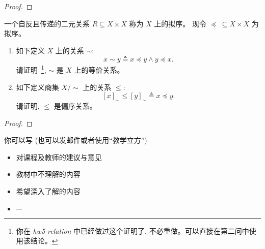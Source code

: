 \documentclass[a4paper, justified]{tufte-handout}
\begin{document}
\begin{proof}
\end{proof}

\begin{problem}[\score{4 = 0 + 4} $\star\star\star$]
  一个自反且传递的二元关系 $R \subseteq X \times X$
  称为 $X$ 上的拟序。
  现令 $\preceq\; \subseteq X \times X$ 为拟序。

  \begin{enumerate}[(1)]
    \item 如下定义 $X$ 上的关系 $\sim$:
      \[
        x \sim y \triangleq x \preceq y \land y \preceq x.
      \]
      请证明~\footnote{你在 \textsl{hw5-relation} 中已经做过这个证明了,
      不必重做。可以直接在第二问中使用该结论。}, $\sim$ 是 $X$ 上的等价关系。
    \item 如下定义商集 $X/\sim$ 上的关系 $\le$:
      \[
        [x]_{\sim} \le [y]_{\sim} \triangleq x \preceq y.
      \]
      请证明, $\le$ 是偏序关系。
  \end{enumerate}
\end{problem}

\begin{proof}
\end{proof}

\begincorrection

\beginfb

你可以写 (也可以发邮件或者使用``教学立方'')
\begin{itemize}
  \item 对课程及教师的建议与意见
  \item 教材中不理解的内容
  \item 希望深入了解的内容
  \item $\cdots$
\end{itemize}
\end{document}
